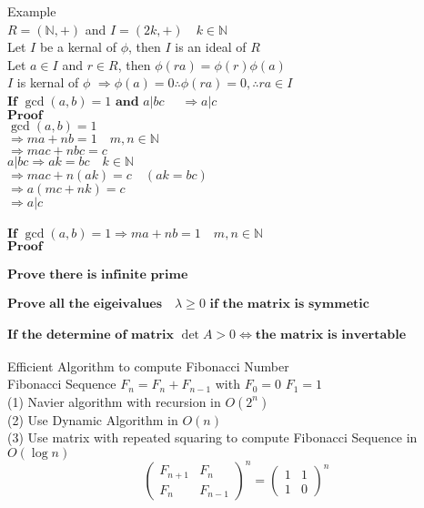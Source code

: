 \documentclass[10pt]{article}
\begin{document}
Example\\
$R = (\mathbb{N}, +)$ and $I = (2k, +) \quad k \in \mathbb{N}$\\

Let $I$ be a kernal of $\phi$, then $I$ is an ideal of $R$\\
Let $a \in I$ and $r \in R$, then $\phi(ra) = \phi(r)\phi(a)$\\
$I$ is kernal of $\phi$ $\Rightarrow \phi(a) = 0 \therefore \phi(ra) = 0, \therefore ra \in I$\\

$\textbf{If }  \gcd(a, b) = 1 \textbf{ and }  a \vert bc \quad$  $\Rightarrow a \vert c$ \\
$\textbf{Proof}$ \\
$\gcd(a, b) = 1  $\\
$\Rightarrow ma+nb = 1\quad m, n \in \mathbb{N} $ \\
$\Rightarrow mac + nbc = c$ \\
$a \vert bc \Rightarrow ak = bc \quad k \in \mathbb{N} $ \\
$\Rightarrow mac + n(ak)=c \quad    (ak=bc) $ \\
$\Rightarrow a(mc + nk) = c$  \\
$\Rightarrow a \vert c $ \\
\\
$\textbf{If } \gcd(a, b) = 1 \Rightarrow ma + nb = 1 \quad m, n \in \mathbb{N}$\\
$\textbf{Proof}$\\
\\
$\textbf{Prove there is infinite prime}$\\
\\
$\textbf{Prove all the eigeivalues}\quad  \lambda \geq  0  \textbf{ if the matrix is symmetic}$\\
\\
$\textbf{If the determine of matrix } \det{A} > 0 \iff \textbf{the matrix is invertable}$\\
\\
Efficient Algorithm to compute Fibonacci Number \\
Fibonacci Sequence   
$F_{n} = F_{n} + F_{n-1}$ with $F_{0} = 0$
$F_{1} = 1$ \\
(1) Navier algorithm with recursion in $O(2^n)$ \\
(2) Use Dynamic Algorithm in $O(n)$\\
(3) Use matrix with repeated squaring to compute Fibonacci Sequence in $O(\log{n})$
\[\left(\begin{array}{cc} F_{n+1} & F_{n} \\ F_{n} & F_{n-1} \end{array} \right)^n =  \left(\begin{array}{cc}1 & 1 \\ 1 & 0 \end{array} \right)^n \]
\\
\newpage
\end{document}
